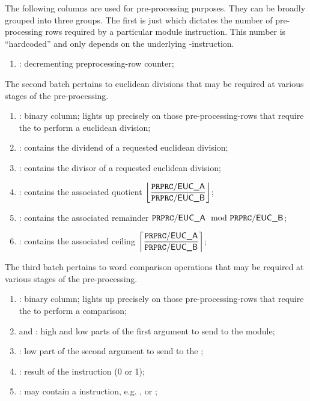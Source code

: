 The following columns are used for pre-processing purposes.
They can be broadly grouped into three groups.
The first is just \ppCt{} which dictates the number of pre-processing rows required by a particular \mmuMod{} module instruction.
This number is ``hardcoded'' and only depends on the underlying \mmuMod{}-instruction.
\begin{enumerate}
	\item \ppCt:
		decrementing preprocessing-row counter;
\end{enumerate}
The second batch pertains to euclidean divisions that may be required at various stages of the pre-processing.
\begin{enumerate}[resume]
	\item \ppEucFlag:
		binary column;
		lights up precisely on those pre-processing-rows that require the \eucMod{} to perform a euclidean division;
	\item \ppEucA:
		contains the dividend of a requested euclidean division;
	\item \ppEucB:
		contains the divisor of a requested euclidean division;
	\item \ppEucQuot:
		contains the associated quotient $\displaystyle \left\lfloor \frac{\texttt{PRPRC}\textsf{/}{\textsf{\textsf{EUC}\_A}}}{\texttt{PRPRC}\textsf{/}{\textsf{\textsf{EUC}\_B}}} \right\rfloor$;
	\item \ppEucRem:
		contains the associated remainder $\texttt{PRPRC}\textsf{/}{\textsf{\textsf{EUC}\_A}} \mod {\texttt{PRPRC}\textsf{/}{\textsf{\textsf{EUC}\_B}}}$;
	\item \ppEucCeil:
		contains the associated ceiling $\displaystyle \left\lceil \frac{\texttt{PRPRC}\textsf{/}{\textsf{\textsf{EUC}\_A}}}{\texttt{PRPRC}\textsf{/}{\textsf{\textsf{EUC}\_B}}} \right\rceil$;
\end{enumerate}
The third batch pertains to word comparison operations that may be required at various stages of the pre-processing.
\begin{enumerate}[resume]
	\item \ppWcpFlag:
		binary column;
		lights up precisely on those pre-processing-rows that require the \wcpMod{} to perform a comparison;
	\item \ppWcpArgOneHi{} and \ppWcpArgOneLo{}:
		high and low parts of the first argument to send to the \wcpMod{} module;
	\item \ppWcpArgTwoLo{}:
		low part of the second argument to send to the \wcpMod;
	\item \ppWcpRes:
		result of the instruction (0 or 1);
	\item \ppWcpInst:
		may contain a \wcpMod{} instruction, e.g. ,  or ;
\end{enumerate}
